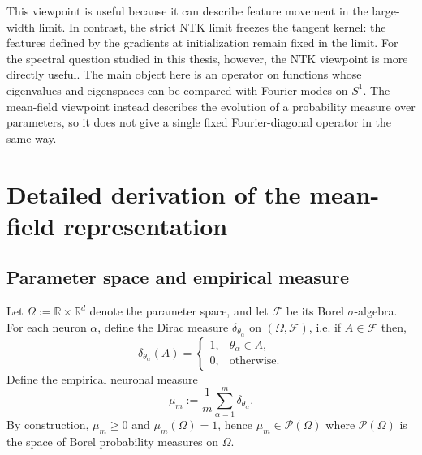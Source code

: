 This viewpoint is useful because it can describe feature movement in the
large-width limit. In contrast, the strict NTK limit freezes the tangent kernel:
the features defined by the gradients at initialization remain fixed in the
limit. For the spectral question studied in this thesis, however, the NTK
viewpoint is more directly useful. The main object here is an operator on
functions whose eigenvalues and eigenspaces can be compared with Fourier modes
on \(S^1\). The mean-field viewpoint instead describes the evolution of a
probability measure over parameters, so it does not give a single fixed
Fourier-diagonal operator in the same way.

\section{Detailed derivation of the mean-field representation}\label{app:mf-detailed}

\subsection{Parameter space and empirical measure}\label{app:mf-empirical-measure}

Let $\Omega := \mathbb{R} \times \mathbb{R}^d$
denote the parameter space, and let $\mathcal{F}$ be its Borel $\sigma$-algebra.
For each neuron $\alpha$, define the Dirac measure $\delta_{\theta_\alpha}$ on
$(\Omega,\mathcal{F})$, i.e. if $A \in \mathcal{F}$ then,
\[
	\delta_{\theta_\alpha}(A)
	=
	\begin{cases}
		1, & \theta_\alpha \in A, \\
		0, & \text{otherwise}.
	\end{cases}
\]
Define the empirical neuronal measure
\begin{equation}
	\mu_m := \frac{1}{m}\sum_{\alpha=1}^m \delta_{\theta_\alpha}.
	\label{eq:app-empirical-measure}
\end{equation}
By construction, $\mu_m \ge 0$ and  $\mu_m(\Omega)=1$, hence $\mu_m \in
	\mathcal P(\Omega)$ where $\mathcal P(\Omega)$ is the space of Borel
probability measures on $\Omega$.

